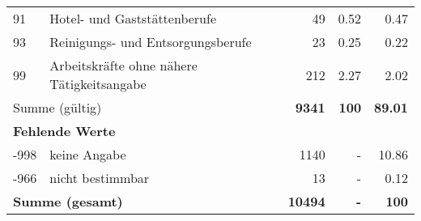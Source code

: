 \begin{longtable}{lXrrr}
        91 & \multicolumn{1}{X}{Hotel- und Gaststättenberufe} & %
          \num{49} &
          \num[round-mode=places,round-precision=2]{0,52} &
          \num[round-mode=places,round-precision=2]{0,47} \\

        93 & \multicolumn{1}{X}{Reinigungs- und Entsorgungsberufe} & %
          \num{23} &
          \num[round-mode=places,round-precision=2]{0,25} &
          \num[round-mode=places,round-precision=2]{0,22} \\

        99 & \multicolumn{1}{X}{Arbeitskräfte ohne nähere Tätigkeitsangabe} & %
          \num{212} &
          \num[round-mode=places,round-precision=2]{2,27} &
          \num[round-mode=places,round-precision=2]{2,02} \\

     \midrule
     \multicolumn{2}{l}{Summe (gültig)} &
       \textbf{\num{9341}} &
     \textbf{100} &
       \textbf{\num[round-mode=places,round-precision=2]{89,01}} \\
     \multicolumn{5}{l}{\textbf{Fehlende Werte}}\\
       -998 &
       keine Angabe &
         \num{1140} &
        - &
         \num[round-mode=places,round-precision=2]{10,86} \\
       -966 &
       nicht bestimmbar &
         \num{13} &
        - &
         \num[round-mode=places,round-precision=2]{0,12} \\
     \midrule
     \multicolumn{2}{l}{\textbf{Summe (gesamt)}} &
          \textbf{\num{10494}} &
        \textbf{-} &
        \textbf{100} \\
     \bottomrule
     \end{longtable}
     
